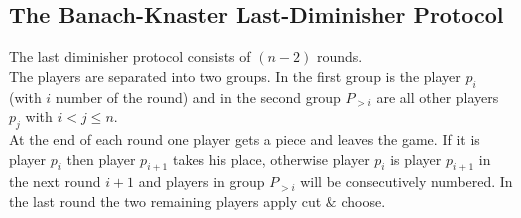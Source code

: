\newpage
\subsection{The Banach-Knaster Last-Diminisher Protocol}

The last diminisher protocol consists of $(n-2)$ rounds.\\The players are separated into two groups. In the first group is the player $p_i$ (with $i$ number of the round) and in the second group $P_{>i}$ are all other players $p_j$ with $i <j\leq n$.\\ At the end of each round one player gets a piece and leaves the game. If it is player $p_i$ then player $p_{i+1}$ takes his place, otherwise player $p_i$ is player $p_{i+1}$ in the next round $i+1$ and players in group $P_{>i}$ will be consecutively numbered. In the last round the two remaining players apply cut $\&$ choose. 


